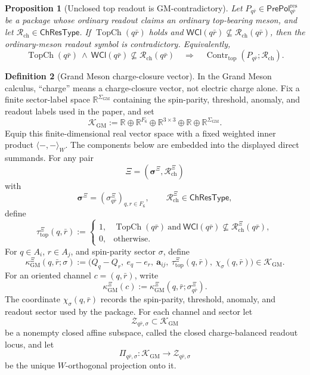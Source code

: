 \documentclass[11pt]{article}
\theoremstyle{definition}
\newtheorem{definition}{Definition}
\theoremstyle{plain}
\newtheorem{proposition}[definition]{Proposition}
\DeclareMathOperator{\TopCh}{TopCh}
\DeclareMathOperator{\Contr}{Contr}
\begin{document}
\begin{proposition}[Unclosed top readout is GM-contradictory]
Let \(P_{q\bar r}\in\mathsf{PrePol}^{\mathrm{res}}_{q\bar r}\) be a package
whose ordinary readout claims an ordinary top-bearing meson, and let
\(\mathcal R_{\mathrm{ch}}\in\mathsf{ChResType}\).  If
\(\TopCh(q\bar r)\) holds and
\(\mathsf{WCl}(q\bar r)\nsubseteq\mathcal R_{\mathrm{ch}}(q\bar r)\), then the
ordinary-meson readout symbol is contradictory.  Equivalently,
\[
  \TopCh(q\bar r)
  \ \wedge\
  \mathsf{WCl}(q\bar r)\nsubseteq\mathcal R_{\mathrm{ch}}(q\bar r)
  \quad\Longrightarrow\quad
  \Contr_{\mathrm{top}}(P_{q\bar r};\mathcal R_{\mathrm{ch}}).
\]
\end{proposition}

\begin{definition}[Grand Meson charge-closure vector]
In the Grand Meson calculus, ``charge'' means a charge-closure vector, not
electric charge alone.  Fix a finite sector-label space
\(\mathbb R^{\Sigma_{\mathrm{GM}}}\) containing the spin-parity, threshold,
anomaly, and readout labels used in the paper, and set
\[
  \mathcal K_{\mathrm{GM}}
  :=
  \mathbb R
  \oplus\mathbb R^{F_6}
  \oplus\mathbb R^{3\times3}
  \oplus\mathbb R
  \oplus\mathbb R^{\Sigma_{\mathrm{GM}}}.
\]
Equip this finite-dimensional real vector space with a fixed weighted
inner product \(\langle-,-\rangle_W\).  The components below are embedded
into the displayed direct summands.  For any pair
\[
  \Xi=(\boldsymbol\sigma^\Xi,\mathcal R^\Xi_{\mathrm{ch}})
\]
with
\[
  \boldsymbol\sigma^\Xi=(\sigma^\Xi_{q\bar r})_{q,r\in F_6},
  \qquad
  \mathcal R^\Xi_{\mathrm{ch}}\in\mathsf{ChResType},
\]
define
\[
  \tau_{\mathrm{top}}^{\Xi}(q,\bar r)
  :=
  \begin{cases}
    1,
      & \TopCh(q\bar r)
        \ \text{and}\
        \mathsf{WCl}(q\bar r)\nsubseteq
        \mathcal R^\Xi_{\mathrm{ch}}(q\bar r),\\
    0, & \text{otherwise}.
  \end{cases}
\]
For \(q\in A_i\), \(r\in A_j\), and spin-parity sector \(\sigma\), define
\[
  \kappa_{\mathrm{GM}}^{\Xi}(q,\bar r;\sigma)
  :=
  \bigl(
    Q_q-Q_r,\
    e_q-e_r,\
    \mathbf a_{ij},\
    \tau_{\mathrm{top}}^{\Xi}(q,\bar r),\
    \chi_\sigma(q,\bar r)
  \bigr)
  \in\mathcal K_{\mathrm{GM}} .
\]
For an oriented channel \(c=(q,\bar r)\), write
\[
  \kappa_{\mathrm{GM}}^{\Xi}(c)
  :=
  \kappa_{\mathrm{GM}}^{\Xi}(q,\bar r;\sigma^\Xi_{q\bar r}).
\]
The coordinate \(\chi_\sigma(q,\bar r)\) records the spin-parity,
threshold, anomaly, and readout sector used by the package.
For each channel and sector let
\[
  \mathcal Z_{q\bar r,\sigma}\subset\mathcal K_{\mathrm{GM}}
\]
be a nonempty closed affine subspace, called the closed charge-balanced
readout locus, and let
\[
  \Pi_{q\bar r,\sigma}:\mathcal K_{\mathrm{GM}}\to
  \mathcal Z_{q\bar r,\sigma}
\]
be the unique \(W\)-orthogonal projection onto it.
\end{definition}
\end{document}
